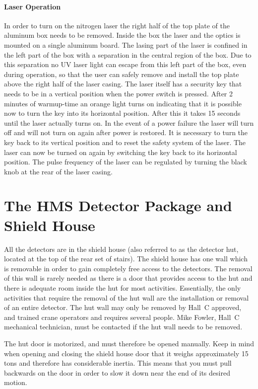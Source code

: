 \paragraph{Laser Operation} 
In order to turn on the nitrogen laser the right half of the top
plate of the aluminum box needs to be removed. Inside the box 
the laser and the optics is mounted on a single aluminum board.
The lasing part of the laser is confined in the left part of the box
with a separation in the central region of the box. Due to this separation
no UV laser light can escape from this left part of the box,
even during operation, so that the user can safely remove and install the
top plate above the right half of the laser casing.
The laser itself has a security key that needs 
to be in a vertical position when the power switch is pressed. After
2 minutes of warmup-time an orange light turns on indicating that
it is possible now to turn the key into its horizontal position.
After this it takes 15 seconds until the laser actually turns on.
In the event of a power failure the laser will turn off and will not
turn on again after power is restored. It is necessary to turn the key
back to its vertical position and to reset the safety system of the laser.
The laser can now be turned on again by switching the key back to its
horizontal position. The pulse frequency of the laser can be regulated by
turning the black knob at the rear of the laser casing.

\section{The HMS Detector Package and Shield House }

All the detectors are in the shield house (also referred to as the detector hut,
located at the top of the
rear set of stairs). The shield house has one wall which is removable
in order to gain completely free access to the detectors. The removal
of this wall is rarely needed as there is a door that provides access
to the hut and there is adequate room inside the hut for most activities.
Essentially, the only activities that require the removal of the hut
wall are the installation or removal of an entire detector. The
hut wall may only be removed by Hall~C approved, and trained crane
operators and requires
several people. Mike Fowler, Hall~C mechanical technician,  
must be contacted if the hut wall needs to be removed.

The hut door is motorized, and must therefore be opened manually. Keep in mind when opening and closing the
shield house door that it weighs approximately 15 tons and therefore has
considerable inertia. This means that you must pull backwards on the door
in order to slow it down near the end of its desired motion.

